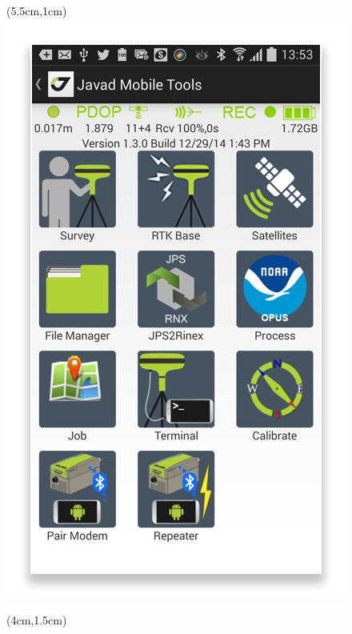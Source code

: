 \documentclass[xetex,с,aspectratio=169]{beamer}
\begin{document}
\begin{frame}
\begin{textblock*}{3cm}
  \end{textblock*}
  \begin{textblock*}{1.5cm}(5.5cm,1cm)
    \includegraphics[width=\textwidth]{../img/javad-mobile-tools}
  \end{textblock*}
  \begin{textblock*}{3cm}(4cm,1.5cm)

\end{textblock*}
\end{frame}
\end{document}
